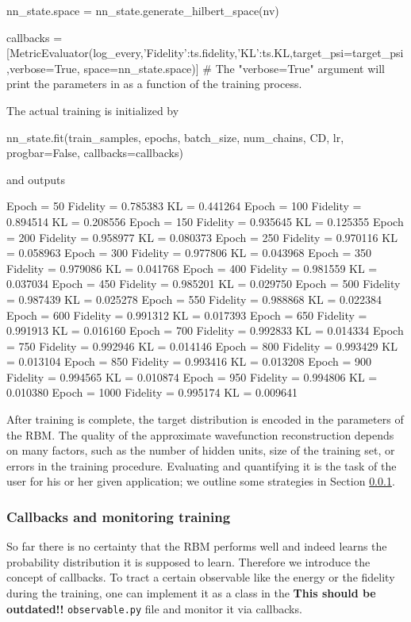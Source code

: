 \documentclass[submission, Phys]{SciPost}
\begin{document}
\begin{python}
nn_state.space = nn_state.generate_hilbert_space(nv)

callbacks = [MetricEvaluator(log_every,{'Fidelity':ts.fidelity,'KL':ts.KL},target_psi=target_psi,verbose=True, 
                             space=nn_state.space)]
# The "verbose=True" argument will print the parameters in { } as a function of the training process.
\end{python}

The actual training is initialized by
\begin{python}
nn_state.fit(train_samples, epochs, batch_size, num_chains, CD, lr, progbar=False, callbacks=callbacks)
\end{python}
and outputs
\begin{python}
	Epoch = 50	Fidelity = 0.785383	KL = 0.441264
	Epoch = 100	Fidelity = 0.894514	KL = 0.208556
	Epoch = 150	Fidelity = 0.935645	KL = 0.125355
	Epoch = 200	Fidelity = 0.958977	KL = 0.080373
	Epoch = 250	Fidelity = 0.970116	KL = 0.058963
	Epoch = 300	Fidelity = 0.977806	KL = 0.043968
	Epoch = 350	Fidelity = 0.979086	KL = 0.041768
	Epoch = 400	Fidelity = 0.981559	KL = 0.037034
	Epoch = 450	Fidelity = 0.985201	KL = 0.029750
	Epoch = 500	Fidelity = 0.987439	KL = 0.025278
	Epoch = 550	Fidelity = 0.988868	KL = 0.022384
	Epoch = 600	Fidelity = 0.991312	KL = 0.017393
	Epoch = 650	Fidelity = 0.991913	KL = 0.016160
	Epoch = 700	Fidelity = 0.992833	KL = 0.014334
	Epoch = 750	Fidelity = 0.992946	KL = 0.014146
	Epoch = 800	Fidelity = 0.993429	KL = 0.013104
	Epoch = 850	Fidelity = 0.993416	KL = 0.013208
	Epoch = 900	Fidelity = 0.994565	KL = 0.010874
	Epoch = 950	Fidelity = 0.994806	KL = 0.010380
	Epoch = 1000	Fidelity = 0.995174	KL = 0.009641
\end{python}

After training is complete, the target distribution is encoded in the parameters of the RBM.
The quality of the approximate wavefunction reconstruction depends on many factors, such as the number of hidden units, size of the training set, or errors in the training procedure.
Evaluating and quantifying it is the task of the user for his or her given application; we outline some strategies in Section \ref{Sec:Callbacks}.

\subsubsection{Callbacks and monitoring training}
\label{Sec:Callbacks}

So far there is no certainty that the RBM performs well and indeed learns the probability distribution it is supposed to learn.
Therefore we introduce the concept of callbacks. 
To tract a certain observable like the energy or the fidelity during the training, one can implement it as a class in the \textbf{This should be outdated!!} \verb|observable.py| file and monitor it via callbacks.
\end{document}
